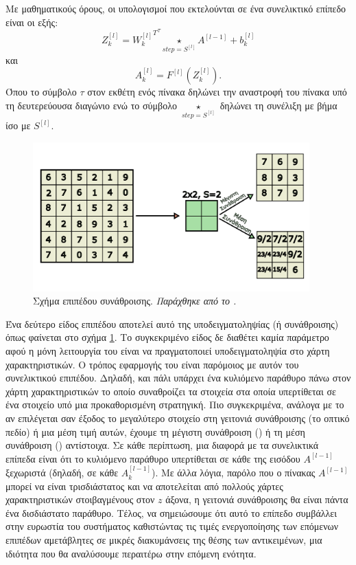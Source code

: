 Με μαθηματικούς όρους, οι υπολογισμοί που εκτελούνται σε ένα συνελικτικό επίπεδο είναι οι εξής:
\begin{equation}
  Z^{[l]}_k = {{W^{[l]}_k}^T }^{\tau} \underset{{step=S^{[l]}}} {\star } A^{[l-1]} + b^{[l]}_k
\end{equation}
και
\begin{equation}
  A^{[l]}_k = F^{[l]}(Z^{[l]}_k).
\end{equation}
Όπου το σύμβολο $\tau$ στον εκθέτη ενός πίνακα δηλώνει την αναστροφή του πίνακα υπό τη δευτερεύουσα διαγώνιο ενώ το σύμβολο $\underset{{step=S^{[l]}}} { 	\star }$ δηλώνει τη συνέλιξη με βήμα ίσο με $S^{[l]}$. \par

\begin{figure}[h]
  \centering
  \includegraphics[width=0.95\textwidth]{images/chapter theoritical background/max_avg_pooling_gr.pdf}
  \caption{Σχήμα επιπέδου συνάθροισης. \textit{Παράχθηκε από το \href{https://inkscape.org/}{}.}} 
  \label{fig:max_avg_pooling}
\end{figure}
 
Ένα δεύτερο είδος επιπέδου αποτελεί αυτό της υποδειγματοληψίας (ή συνάθροισης) όπως φαίνεται στο σχήμα \ref{fig:max_avg_pooling}. Το συγκεκριμένο είδος δε διαθέτει καμία παράμετρο αφού η μόνη λειτουργία του είναι να πραγματοποιεί υποδειγματοληψία στο χάρτη χαρακτηριστικών. Ο τρόπος εφαρμογής του είναι παρόμοιος με αυτόν του συνελικτικού επιπέδου. Δηλαδή, και πάλι υπάρχει ένα κυλιόμενο παράθυρο πάνω στον χάρτη χαρακτηριστικών το οποίο συναθροίζει τα στοιχεία στα οποία υπερτίθεται σε ένα στοιχείο υπό μια προκαθορισμένη στρατηγική. Πιο συγκεκριμένα, ανάλογα με το αν επιλέγεται σαν έξοδος το μεγαλύτερο στοιχείο στη γειτονιά συνάθροισης (το οπτικό πεδίο) ή μια μέση τιμή αυτών, έχουμε τη μέγιστη συνάθροιση () ή τη μέση συνάθροιση () αντίστοιχα. Σε κάθε περίπτωση, μια διαφορά με τα συνελικτικά επίπεδα είναι ότι το κυλιόμενο παράθυρο υπερτίθεται σε κάθε  της εισόδου $A^{[l-1]}$ ξεχωριστά (δηλαδή, σε κάθε $A^{[l-1]}_k$). Με άλλα λόγια, παρόλο που ο πίνακας $A^{[l-1]}$ μπορεί να είναι τρισδιάστατος και να αποτελείται από πολλούς χάρτες χαρακτηριστικών στοιβαγμένους στον $z$ άξονα, η γειτονιά συνάθροισης θα είναι πάντα ένα δισδιάστατο παράθυρο. Τέλος, να σημειώσουμε ότι αυτό το επίπεδο συμβάλλει στην ευρωστία του συστήματος καθιστώντας τις τιμές ενεργοποίησης των επόμενων επιπέδων αμετάβλητες σε μικρές διακυμάνσεις της θέσης των αντικειμένων, μια ιδιότητα που θα αναλύσουμε περαιτέρω στην επόμενη ενότητα. \par

